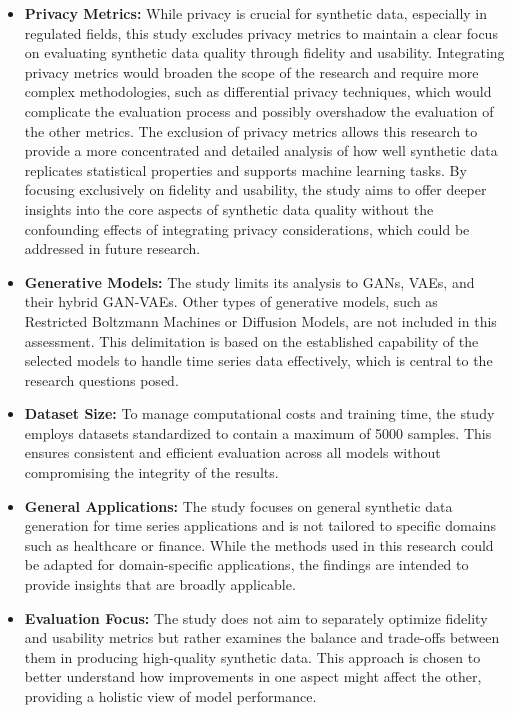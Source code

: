 \documentclass{article}
\begin{document}
\begin{itemize}
    \item \textbf{Privacy Metrics:} While privacy is crucial for synthetic data, especially in regulated fields, this study excludes privacy metrics to maintain a clear focus on evaluating synthetic data quality through fidelity and usability. Integrating privacy metrics would broaden the scope of the research and require more complex methodologies, such as differential privacy techniques, which would complicate the evaluation process and possibly overshadow the evaluation of the other metrics. The exclusion of privacy metrics allows this research to provide a more concentrated and detailed analysis of how well synthetic data replicates statistical properties and supports machine learning tasks. By focusing exclusively on fidelity and usability, the study aims to offer deeper insights into the core aspects of synthetic data quality without the confounding effects of integrating privacy considerations, which could be addressed in future research.

    \item \textbf{Generative Models:} The study limits its analysis to GANs, VAEs, and their hybrid GAN-VAEs. Other types of generative models, such as Restricted Boltzmann Machines or Diffusion Models, are not included in this assessment. This delimitation is based on the established capability of the selected models to handle time series data effectively, which is central to the research questions posed.

    \item \textbf{Dataset Size:} To manage computational costs and training time, the study employs datasets standardized to contain a maximum of 5000 samples. This ensures consistent and efficient evaluation across all models without compromising the integrity of the results.
    
    \item \textbf{General Applications:} The study focuses on general synthetic data generation for time series applications and is not tailored to specific domains such as healthcare or finance. While the methods used in this research could be adapted for domain-specific applications, the findings are intended to provide insights that are broadly applicable.

    \item \textbf{Evaluation Focus:} The study does not aim to separately optimize fidelity and usability metrics but rather examines the balance and trade-offs between them in producing high-quality synthetic data. This approach is chosen to better understand how improvements in one aspect might affect the other, providing a holistic view of model performance. 

\end{itemize}
\end{document}
